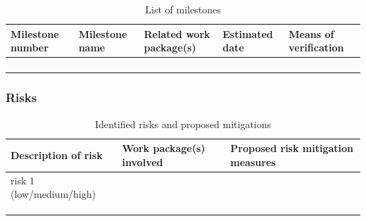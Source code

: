 \documentclass[11pt]{article}
\begin{document}
\begin{table}[!htbp]
\caption{List of milestones}
\centering
\begin{tabular}{@{}lllll@{}}
\toprule
\textbf{Milestone number} & \textbf{Milestone name} & \textbf{Related work package(s)} & \textbf{Estimated date} & \textbf{Means of verification} \\ \midrule
                          &                         &                                  &                         &                                \\
                          &                         &                                  &                         &                                \\
                          &                         &                                  &                         &                                \\
                          &                         &                                  &                         &                                \\ \bottomrule
\end{tabular}
\end{table}


\subsubsection{Risks}\label{risks}

\begin{table}[!htbp]
\caption{Identified risks and proposed mitigations}
\centering
\begin{tabular}{@{}lll@{}}
\toprule
\textbf{Description of risk} & \textbf{Work package(s) involved} & \textbf{Proposed risk mitigation measures} \\ \midrule
risk 1 (low/medium/high)     &                                   &                                            \\
                             &                                   &                                            \\
                             &                                   &                                            \\
                             &                                   &                                            \\ \bottomrule
\end{tabular}
\end{table}
\end{document}
